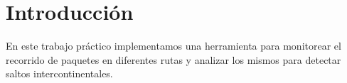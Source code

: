 \section{Introducción}
En este trabajo práctico implementamos una herramienta para monitorear el recorrido de paquetes en diferentes rutas y analizar los mismos para detectar saltos intercontinentales.

